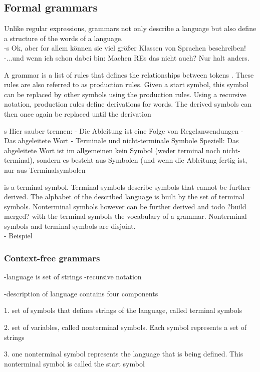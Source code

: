 \subsection{Formal grammars}\label{sec:BackgroundGrammar}
Unlike regular expressions, grammars not only describe a language but also define a structure of the words of a language.\\

-s Ok, aber for allem können sie viel größer Klassen von Sprachen beschreiben!
-...und wenn ich schon dabei bin: Machen REs das nicht auch? Nur halt anders.

A grammar is a list of rules that defines the relationships between tokens \cite{LexYacc.1992}.
These rules are also referred to as production rules.
Given a start symbol, this symbol can be replaced by other symbols using the production rules.
Using a recursive notation, production rules define derivations for words. The derived symbols can then once again be replaced until the derivation

s Hier sauber trennen:
- Die Ableitung ist eine Folge von Regelanwendungen
- Das abgeleitete Wort
- Terminale und nicht-terminale Symbole
Speziell: Das abgeleitete Wort ist im allgemeinen kein Symbol
(weder terminal noch nicht-terminal), sondern es besteht aus
Symbolen (und wenn die Ableitung fertig ist, nur aus Terminalsymbolen

is a terminal symbol.  
Terminal symbols describe symbols that cannot be further derived. The alphabet of the described language is built by the set of terminal symbols.
Nonterminal symbols however can be further derived and todo ?build  merged? with the terminal symbols the vocabulary of a grammar. Nonterminal symbols and terminal symbols are disjoint. 
\\
- Beispiel

\subsubsection{Context-free grammars}
-language is set of strings
-recursive notation

-description of language contains four components

1. set of symbols that defines strings of the language, called terminal symbols

2. set of variables, called nonterminal symbols. Each symbol represents a set of strings

3. one nonterminal symbol represents the language that is being defined. This nonterminal symbol is called the start symbol

